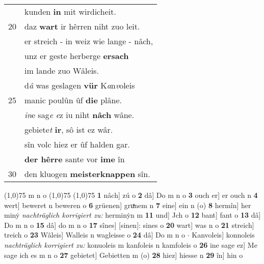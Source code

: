 \documentclass[8pt,a4paper,notitlepage]{article}
\begin{document}
\begin{table}[ht]
\begin{minipage}[t]{0.5\linewidth}
\begin{tabular}{rl}
 & kunden  \textbf{in} mit wirdicheit.\\ 
20 & daz \textbf{wart} ir hêrren niht zuo leit.\\ 
 & er streich - in weiz wie lange - nâch,\\ 
 & unz er geste herberge \textbf{ersach}\\ 
 & im lande zuo Wâleis.\\ 
 & d\textit{â} was geslagen \textbf{vür} K\textit{a}n\textit{v}oleis\\ 
25 & manic poulûn ûf \textbf{die} plâne.\\ 
 & \textit{in}e sag\textit{e} \textit{e}z iu niht \textbf{nâch} wâne.\\ 
 & gebiete\textit{t} \textbf{ir}, sô ist ez wâr.\\ 
 & sîn volc hiez er ûf halden gar.\\ 
 & \textbf{der hêrre} sante vor \textbf{ime} în\\ 
30 & den kluogen \textbf{meisterknappen} sîn.\\ 
\end{tabular}
\scriptsize
\line(1,0){75} \newline
m n o \newline
\line(1,0){75} \newline
\newline
\line(1,0){75} \newline
\textbf{1} nâch] zú o \textbf{2} dâ] Do m n o \textbf{3} ouch er] er ouch n \textbf{4} wert] beweret n beweren o \textbf{6} grüenen] gruͯnem n \textbf{7} eine] ein n (o) \textbf{8} hermîn] her minẏ \textit{nachträglich korrigiert zu:} herminẏn m \textbf{11} und] Jch o \textbf{12} bant] fant o \textbf{13} dâ] Do m n o \textbf{15} dâ] do m n o \textbf{17} sînes] [sinen]: sines o \textbf{20} wart] was n o \textbf{21} streich] treich o \textbf{23} Wâleis] Walleis n wagleisse o \textbf{24} dâ] Do m n o  $\cdot$ Kanvoleis] konnoleis \textit{nachträglich korrigiert zu:} konuoleis m kanfoleis n kamfoleis o \textbf{26} ine sage ez] Me sage ich es m n o \textbf{27} gebietet] Gebietten m (o) \textbf{28} hiez] hiesse n \textbf{29} în] hin o \newline
\end{minipage}
\end{table}
\newpage
\end{document}

